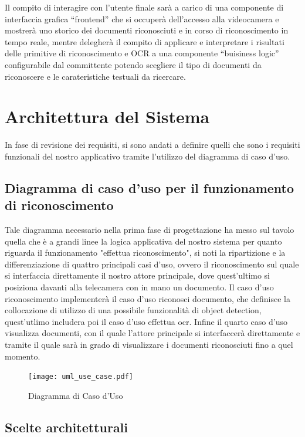 \documentclass[12pt,a4paper]{article}
\begin{document}
Il compito di interagire con l'utente finale sarà a carico di una
componente di interfaccia grafica ``frontend'' che si occuperà
dell'accesso alla videocamera e mostrerà uno storico dei documenti
riconosciuti e in corso di riconoscimento in tempo reale, mentre
delegherà il compito di applicare e interpretare i risultati delle
primitive di riconoscimento e OCR a una componente ``buisiness logic''
configurabile dal committente potendo scegliere il tipo di documenti da
riconoscere e le carateristiche testuali da ricercare.

\section{Architettura del Sistema}

In fase di revisione dei requisiti, si sono andati a definire quelli che sono i requisiti
funzionali del nostro applicativo tramite l'utilizzo del diagramma di
caso d'uso.

\subsection{Diagramma di caso d'uso per il funzionamento di
riconoscimento}

Tale diagramma necessario nella prima fase di progettazione ha messo sul
tavolo quella che è a grandi linee la logica applicativa del nostro
sistema per quanto riguarda il funzionamento "effettua riconoscimento", si noti la ripartizione e la differenziazione di quattro principali
casi d'uso, ovvero il riconoscimento sul quale si interfaccia
direttamente il nostro attore principale, dove quest'ultimo si posiziona davanti alla telecamera con in mano un documento. Il caso d'uso riconoscimento
implementerà il caso d'uso riconosci documento, che definisce la collocazione di
utilizzo di una possibile funzionalità di object detection, quest'utlimo
includera poi il caso d'uso effettua ocr.
Infine il quarto caso d'uso visualizza documenti, con il quale l'attore principale si interfaccerà direttamente e tramite il quale sarà in grado di
visualizzare i documenti riconosciuti fino a quel momento.

\begin{figure}[H]
    \caption{Diagramma di Caso d'Uso}
    \centering
    \texttt{[image: uml\_use\_case.pdf]}
\end{figure}

\subsection{Scelte architetturali}
\end{document}
